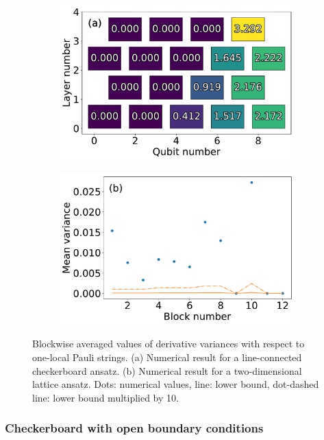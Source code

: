 \begin{figure}
    \centering
    \begin{subfigure}{.48\linewidth}
        \centering
        \includegraphics[width=\linewidth]{figures/line_endpoint.pdf}
    \end{subfigure}
    \begin{subfigure}{.48\linewidth}
        \centering
        \includegraphics[width=\linewidth]{figures/lattice_scatter.pdf}
    \end{subfigure}
    \caption{Blockwise averaged values of derivative variances with respect to one-local Pauli strings. (a) Numerical result for a line-connected checkerboard ansatz. (b) Numerical result for a two-dimensional lattice ansatz. Dots: numerical values, line: lower bound,  dot-dashed line: lower bound multiplied by 10.}
    \label{fig:alt_connect}
\end{figure}


\subsubsection{Checkerboard with open boundary conditions}


